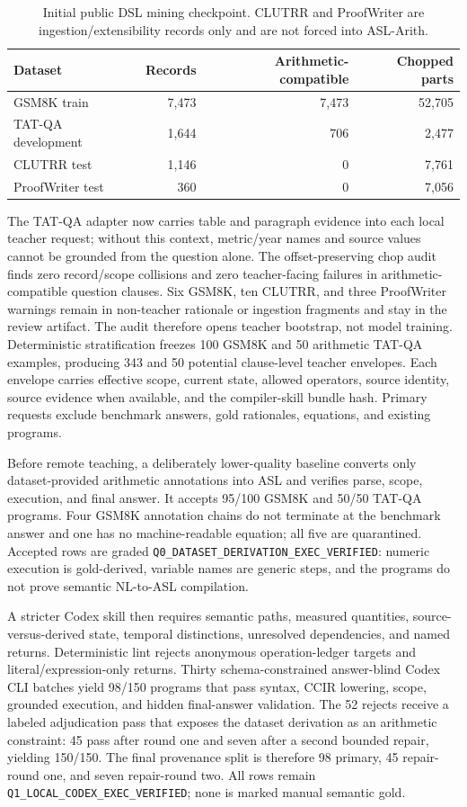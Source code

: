 \documentclass[11pt]{article}
\begin{document}
\begin{table}[t]
\centering\small
\caption{Initial public DSL mining checkpoint. CLUTRR and ProofWriter are
ingestion/extensibility records only and are not forced into ASL-Arith.}
\label{tab:dsl-mining}
\begin{tabular}{lrrr}
\toprule
Dataset & Records & Arithmetic-compatible & Chopped parts\\
\midrule
GSM8K train & 7,473 & 7,473 & 52,705\\
TAT-QA development & 1,644 & 706 & 2,477\\
CLUTRR test & 1,146 & 0 & 7,761\\
ProofWriter test & 360 & 0 & 7,056\\
\bottomrule
\end{tabular}
\end{table}

The TAT-QA adapter now carries table and paragraph evidence into each local
teacher request; without this context, metric/year names and source values cannot
be grounded from the question alone. The offset-preserving chop audit finds zero record/scope collisions and zero
teacher-facing failures in arithmetic-compatible question clauses. Six GSM8K,
ten CLUTRR, and three ProofWriter warnings remain in non-teacher rationale or
ingestion fragments and stay in the review artifact. The audit therefore opens
teacher bootstrap, not model training. Deterministic stratification freezes 100
GSM8K and 50 arithmetic TAT-QA examples, producing 343 and 50 potential
clause-level teacher envelopes. Each envelope carries effective scope, current
state, allowed operators, source identity, source evidence when available, and
the compiler-skill bundle hash. Primary requests exclude benchmark answers,
gold rationales, equations, and existing programs.

Before remote teaching, a deliberately lower-quality baseline converts only
dataset-provided arithmetic annotations into ASL and verifies parse, scope,
execution, and final answer. It accepts 95/100 GSM8K and 50/50 TAT-QA programs.
Four GSM8K annotation chains do not terminate at the benchmark answer and one
has no machine-readable equation; all five are quarantined. Accepted rows are
graded \texttt{Q0\_DATASET\_DERIVATION\_EXEC\_VERIFIED}: numeric execution is
gold-derived, variable names are generic steps, and the programs do not prove
semantic NL-to-ASL compilation.

A stricter Codex skill then requires semantic paths, measured quantities,
source-versus-derived state, temporal distinctions, unresolved dependencies, and
named returns. Deterministic lint rejects anonymous operation-ledger targets and
literal/expression-only returns. Thirty schema-constrained answer-blind Codex CLI
batches yield 98/150 programs that pass syntax, CCIR lowering, scope, grounded
execution, and hidden final-answer validation. The 52 rejects receive a labeled
adjudication pass that exposes the dataset derivation as an arithmetic constraint:
45 pass after round one and seven after a second bounded repair, yielding 150/150.
The final provenance split is therefore 98 primary, 45 repair-round one, and
seven repair-round two. All rows remain
\texttt{Q1\_LOCAL\_CODEX\_EXEC\_VERIFIED}; none is marked manual semantic gold.
\end{document}
